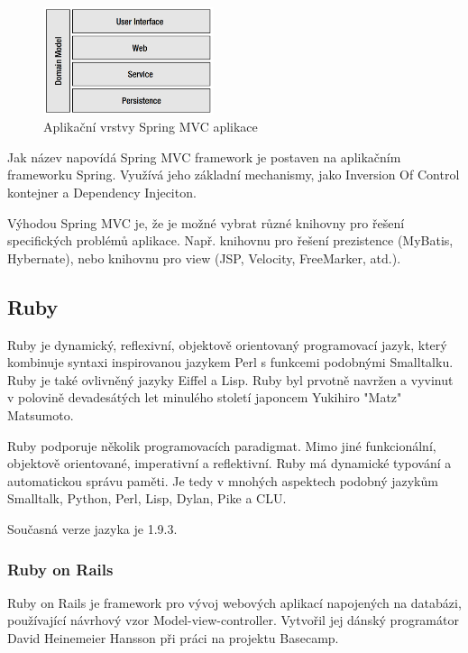 \begin{figure}[htb]
\begin{center}
\includegraphics[width=50mm]{./pictures/spring-mvc-layers.png}
\caption{Aplikační vrstvy Spring MVC aplikace \cite{liu2006research}}
\label{fig:spring-mvc-layers}
\end{center}
\end{figure}

Jak název napovídá Spring MVC framework je postaven na aplikačním frameworku Spring. Využívá jeho základní mechanismy, jako Inversion Of Control kontejner a Dependency Injeciton.

Výhodou Spring MVC je, že je možné vybrat různé knihovny pro řešení specifických problémů aplikace. Např. knihovnu pro řešení prezistence (MyBatis, Hybernate), nebo knihovnu pro view (JSP, Velocity, FreeMarker, atd.)\cite{liu2006research}.

\subsection{Ruby}
\label{sec:ruby}
Ruby je dynamický, reflexivní, objektově orientovaný programovací jazyk, který kombinuje syntaxi inspirovanou jazykem Perl s funkcemi podobnými Smalltalku. Ruby je také ovlivněný jazyky Eiffel a Lisp. Ruby byl prvotně navržen a vyvinut v polovině devadesátých let minulého století japoncem Yukihiro "Matz" Matsumoto.\cite{website:wiki:ruby}

Ruby podporuje několik programovacích paradigmat. Mimo jiné funkcionální, objektově orientované, imperativní a reflektivní. Ruby má dynamické typování a automatickou správu paměti. Je tedy v mnohých aspektech podobný jazykům Smalltalk, Python, Perl, Lisp, Dylan, Pike a CLU. \cite{website:wiki:ruby}

Současná verze jazyka je 1.9.3.
\subsubsection{Ruby on Rails}
\label{sec:ror}
Ruby on Rails je framework pro vývoj webových aplikací napojených na databázi, používající návrhový vzor Model-view-controller. Vytvořil jej dánský programátor David Heinemeier Hansson při práci na projektu Basecamp\cite{website:wiki:ror}.

